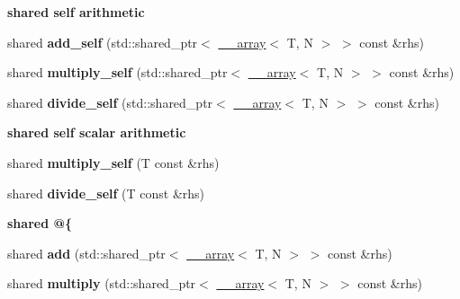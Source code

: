 \begin{Indent}{\bf shared self arithmetic}\par
\begin{DoxyCompactItemize}
\item 
\hypertarget{class____array_ab98796270b9e65a78d5d9eda70c66ef9}{shared {\bfseries add\-\_\-self} (std\-::shared\-\_\-ptr$<$ \hyperlink{class____array}{\-\_\-\-\_\-array}$<$ T, N $>$ $>$ const \&rhs)}\label{class____array_ab98796270b9e65a78d5d9eda70c66ef9}

\item 
\hypertarget{class____array_a34920f8760f31932fa0b7134ad852fe3}{shared {\bfseries multiply\-\_\-self} (std\-::shared\-\_\-ptr$<$ \hyperlink{class____array}{\-\_\-\-\_\-array}$<$ T, N $>$ $>$ const \&rhs)}\label{class____array_a34920f8760f31932fa0b7134ad852fe3}

\item 
\hypertarget{class____array_a99892174a079f472bcd3f95621e5b18e}{shared {\bfseries divide\-\_\-self} (std\-::shared\-\_\-ptr$<$ \hyperlink{class____array}{\-\_\-\-\_\-array}$<$ T, N $>$ $>$ const \&rhs)}\label{class____array_a99892174a079f472bcd3f95621e5b18e}

\end{DoxyCompactItemize}
\end{Indent}
\begin{Indent}{\bf shared self scalar arithmetic}\par
\begin{DoxyCompactItemize}
\item 
\hypertarget{class____array_a87ee1d56dc650d1cc15fc4a17e29a2ff}{shared {\bfseries multiply\-\_\-self} (T const \&rhs)}\label{class____array_a87ee1d56dc650d1cc15fc4a17e29a2ff}

\item 
\hypertarget{class____array_a082fa2c88f43930d0138e9ccd383e59b}{shared {\bfseries divide\-\_\-self} (T const \&rhs)}\label{class____array_a082fa2c88f43930d0138e9ccd383e59b}

\end{DoxyCompactItemize}
\end{Indent}
\begin{Indent}{\bf shared @\{}\par
\begin{DoxyCompactItemize}
\item 
\hypertarget{class____array_ab20b7f53c81ac31b349d31bc58e650f6}{shared {\bfseries add} (std\-::shared\-\_\-ptr$<$ \hyperlink{class____array}{\-\_\-\-\_\-array}$<$ T, N $>$ $>$ const \&rhs)}\label{class____array_ab20b7f53c81ac31b349d31bc58e650f6}

\item 
\hypertarget{class____array_a35d7cfec43ce9f395f148b64a6083a69}{shared {\bfseries multiply} (std\-::shared\-\_\-ptr$<$ \hyperlink{class____array}{\-\_\-\-\_\-array}$<$ T, N $>$ $>$ const \&rhs)}\label{class____array_a35d7cfec43ce9f395f148b64a6083a69}

\end{DoxyCompactItemize}
\end{Indent}
